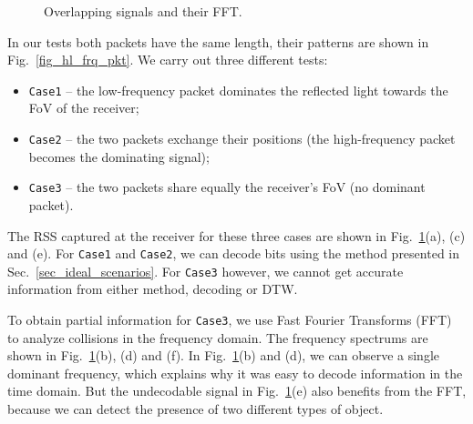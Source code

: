 \documentclass[10pt]{sig-alternate-05-2015}
\begin{document}
{\def \width{0.49} 
\begin{figure}[!t]
	\hfill
	
	\hfill
	
	\hfill
	\vspace{-2mm}
	\caption {Overlapping signals and their FFT.}
	\vspace{-4mm}
	\label{fig_multi_tag}
\end{figure}

In our tests both packets have the same length, their patterns are shown in Fig.~\ref{fig_hl_frq_pkt}. We carry out three different tests: 
\begin{itemize}
	\item {\tt Case1} --
	the low-frequency packet dominates the reflected light towards the FoV of the receiver; 
	\item {\tt Case2} -- the two packets exchange their positions (the high-frequency packet becomes the dominating signal);
	\item {\tt Case3} -- the two packets share equally the receiver's FoV (no dominant packet).
\end{itemize}

The RSS captured at the receiver for these three cases are shown in Fig.~\ref{fig_multi_tag}(a), (c) and (e). For {\tt Case1} and {\tt Case2}, we can decode bits using the method presented in Sec.~\ref{sec_ideal_scenarios}. For {\tt Case3} however, we cannot get accurate information from either method, decoding or DTW.

To obtain partial information for {\tt Case3}, we use Fast Fourier Transforms (FFT) to analyze collisions in the frequency domain. The frequency spectrums are shown in Fig.~\ref{fig_multi_tag}(b), (d) and (f). In Fig.~\ref{fig_multi_tag}(b) and (d), we can observe a single dominant frequency, which explains why it was easy to decode information in the time domain. But the undecodable signal in Fig.~\ref{fig_multi_tag}(e) also benefits from the FFT, because we can detect the presence of two different types of object.

}
\end{document}
